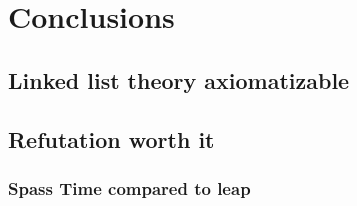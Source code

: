 \chapter{Conclusions\label{sec:conclusiones}}

\section{Linked list theory axiomatizable}

\section{Refutation worth it}

\subsection{Spass Time compared to leap}

